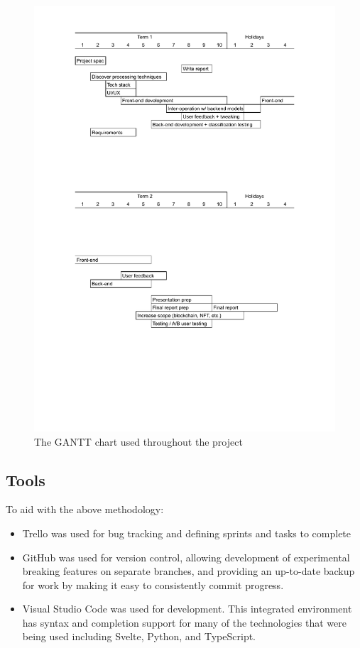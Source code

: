\documentclass[12pt,a4paper]{article}
\begin{document}
\begin{figure}
    \centering
    \includegraphics[scale=0.5]{gantt.pdf}
    \caption{The GANTT chart used throughout the project}
\end{figure}
\subsection{Tools}
To aid with the above methodology:
\begin{itemize}
    \item Trello was used for bug tracking and defining sprints and tasks to complete
    \item GitHub was used for version control, allowing development of experimental breaking features on separate branches, and providing an up-to-date backup for work by making it easy to consistently commit progress.
    \item Visual Studio Code was used for development. This integrated environment has syntax and completion support for many of the technologies that were being used including Svelte, Python, and TypeScript.
\end{itemize}
\end{document}
